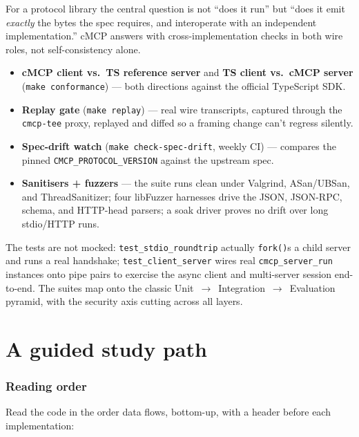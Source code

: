 \documentclass[10pt]{article}
\newcommand{\code}[1]{\texttt{\small #1}}
\begin{document}
For a protocol library the central question is not ``does it run'' but ``does it
emit \emph{exactly} the bytes the spec requires, and interoperate with an
independent implementation.'' cMCP answers with cross-implementation checks in
both wire roles, not self-consistency alone.

\begin{itemize}
  \item \textbf{cMCP client vs.\ TS reference server} and \textbf{TS client vs.\
    cMCP server} (\code{make conformance}) --- both directions against the
    official TypeScript SDK.
  \item \textbf{Replay gate} (\code{make replay}) --- real wire transcripts,
    captured through the \code{cmcp-tee} proxy, replayed and diffed so a framing
    change can't regress silently.
  \item \textbf{Spec-drift watch} (\code{make check-spec-drift}, weekly CI) ---
    compares the pinned \code{CMCP\_PROTOCOL\_VERSION} against the upstream spec.
  \item \textbf{Sanitisers + fuzzers} --- the suite runs clean under Valgrind,
    ASan/UBSan, and ThreadSanitizer; four libFuzzer harnesses drive the JSON,
    JSON-RPC, schema, and HTTP-head parsers; a soak driver proves no drift over
    long stdio/HTTP runs.
\end{itemize}

The tests are not mocked: \code{test\_stdio\_roundtrip} actually \code{fork()}s a
child server and runs a real handshake; \code{test\_client\_server} wires real
\code{cmcp\_server\_run} instances onto pipe pairs to exercise the async client
and multi-server session end-to-end. The suites map onto the classic
Unit~$\rightarrow$~Integration~$\rightarrow$~Evaluation pyramid, with the security
axis cutting across all layers.

\part{A guided study path}

\section{Reading order}

Read the code in the order data flows, bottom-up, with a header before each
implementation:
\end{document}
